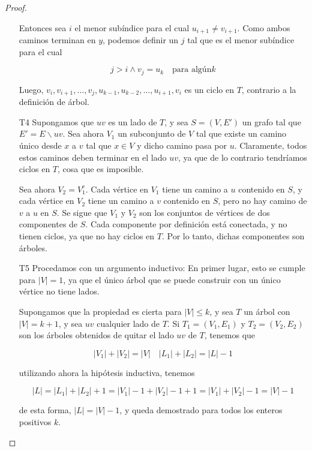 \begin{proof}
\begin{enumerate}
        Entonces sea $i$ el menor subíndice para el cual $u_{i+1} \neq v_{i+1}$. Como ambos caminos terminan en $y$, podemos definir un $j$ tal que es el menor subíndice para el cual
        
        \[
        j > i \wedge v_{j} = u_{k} \quad \text{para algún} k
        \]
        
        Luego, $v_i, v_{i+1}, \dots, v_j, u_{k-1}, u_{k-2}, \dots, u_{i+1}, v_i$ es un ciclo en $T$, contrario a la definición de árbol.
        
        \item[T4] Supongamos que $uv$ es un lado de $T$, y sea $S = (V, E')$ un grafo tal que $E' = E \backslash uv$. Sea ahora $V_1$ un subconjunto de $V$ tal que existe un camino único desde $x$ a $v$ tal que $x \in V$ y dicho camino pasa por $u$. Claramente, todos estos caminos deben terminar en el lado $uv$, ya que de lo contrario tendríamos ciclos en $T$, cosa que es imposible.
        
        Sea ahora $V_2 = V_1^c$. Cada vértice en $V_1$ tiene un camino a $u$ contenido en $S$, y cada vértice en $V_2$ tiene un camino a $v$ contenido en $S$, pero no hay camino de $v$ a $u$ en $S$. Se sigue que $V_1$ y $V_2$ son los conjuntos de vértices de dos componentes de $S$. Cada componente por definición está conectada, y no tienen ciclos, ya que no hay ciclos en $T$. Por lo tanto, dichas componentes son árboles.
        
        \item[T5] Procedamos con un argumento inductivo: En primer lugar, esto se cumple para $|V| = 1$, ya que el único árbol que se puede construir con un único vértice no tiene lados.
        
        Supongamos que la propiedad es cierta para $|V| \leq k$, y sea $T$ un árbol con $|V| = k+1$, y sea $uv$ cualquier lado de $T$. Si $T_1 = (V_1, E_1)$ y $T_2 = (V_2, E_2)$ son los árboles obtenidos de quitar el lado $uv$ de $T$, tenemos que
        
        \[
        |V_1| + |V_2| = |V| \quad |L_1| + |L_2| = |L| - 1
        \]
        
        \noindent utilizando ahora la hipótesis inductiva, tenemos
        
        \[
        |L| = |L_1| + |L_2| + 1 = |V_1| - 1 + |V_2| - 1 + 1 = |V_1| + |V_2| - 1 = |V| - 1
        \]
        
        \noindent de esta forma, $|L| = |V| - 1$, y queda demostrado para todos los enteros positivos $k$.
    \end{enumerate}
\end{proof}
